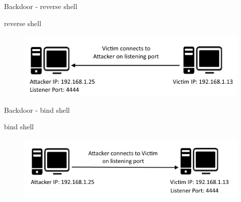 \documentclass[10pt]{beamer}
\begin{document}
\begin{frame}{Backdoor - reverse shell}
	
	\begin{alertblock}{reverse shell}
		  \begin{figure}
			\begin{center}
				\includegraphics[scale=0.6]{reverse-shell.png}
			\end{center}
  		  \end{figure}
    \end{alertblock}


\end{frame}


\begin{frame}{Backdoor - bind shell}
	
	\begin{alertblock}{bind shell}
		  \begin{figure}
			\begin{center}
				\includegraphics[scale=0.6]{bind-shell.png}
			\end{center}
  		  \end{figure}
    \end{alertblock}


\end{frame}
\end{document}
